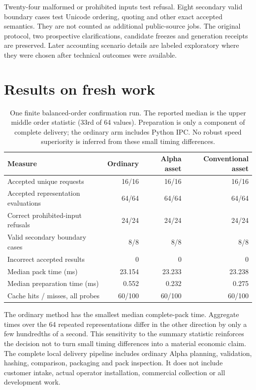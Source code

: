 \documentclass[11pt,a4paper]{article}
\begin{document}
Twenty-four malformed or prohibited inputs test refusal. Eight secondary valid
boundary cases test Unicode ordering, quoting and other exact accepted semantics.
They are not counted as additional public-source jobs. The original protocol,
two prospective clarifications, candidate freezes and generation receipts are
preserved. Later accounting scenario details are labeled exploratory where they
were chosen after technical outcomes were available.

\section{Results on fresh work}
\begin{table}[ht]\centering\small
\begin{tabular}{@{}lrrr@{}}\toprule
Measure & Ordinary & Alpha asset & Conventional asset\\\midrule
Accepted unique requests & 16/16 & 16/16 & 16/16\\
Accepted representation evaluations & 64/64 & 64/64 & 64/64\\
Correct prohibited-input refusals & 24/24 & 24/24 & 24/24\\
Valid secondary boundary cases & 8/8 & 8/8 & 8/8\\
Incorrect accepted results & 0 & 0 & 0\\
Median pack time (ms) & 23.154 & 23.233 & 23.238\\
Median preparation time (ms) & 0.552 & 0.232 & 0.275\\
Cache hits / misses, all probes & 60/100 & 60/100 & 60/100\\\bottomrule
\end{tabular}
\caption{One finite balanced-order confirmation run. The reported median is the
upper middle order statistic (33rd of 64 values). Preparation is only a
component of complete delivery; the ordinary arm includes Python IPC. No robust
speed superiority is inferred from these small timing differences.}
\end{table}

The ordinary method has the smallest median complete-pack time. Aggregate times
over the 64 repeated representations differ in the other direction by only a few
hundredths of a second. This sensitivity to the summary statistic reinforces the
decision not to turn small timing differences into a material economic claim.
The complete local delivery pipeline includes ordinary Alpha planning, validation, hashing,
comparison, packaging and pack inspection. It does not include customer intake,
actual operator installation, commercial collection or all development work.
\end{document}
